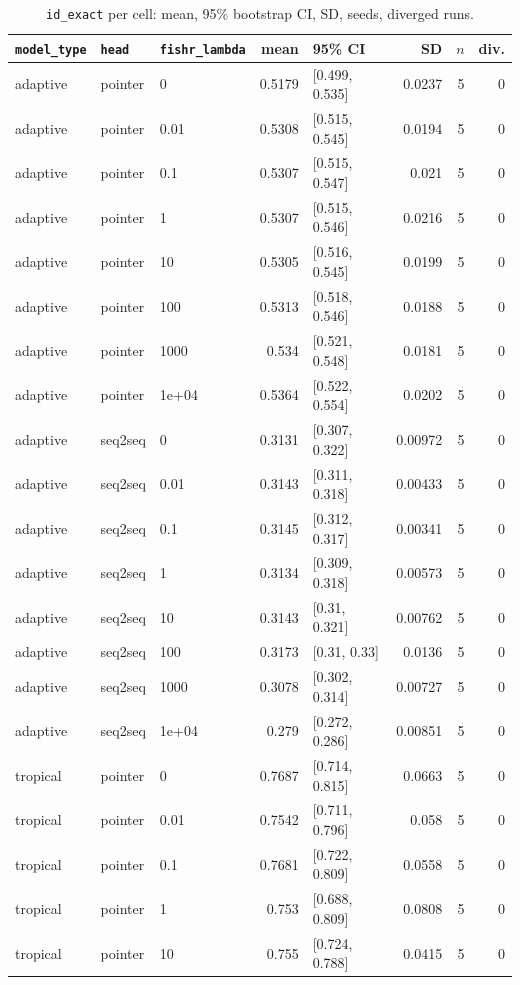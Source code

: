 \documentclass[10pt]{article}
\begin{document}
{\small
\begin{longtable}{lllrlrrr}
\caption{\texttt{id\_exact} per cell: mean, 95\% bootstrap CI, SD, seeds, diverged runs.}\label{tab:summary-id_exact}\\
\toprule
\texttt{model\_type} & \texttt{head} & \texttt{fishr\_lambda} & mean & 95\% CI & SD & $n$ & div.\\
\midrule
\endhead
adaptive & pointer & 0 & 0.5179 & [0.499, 0.535] & 0.0237 & 5 & 0\\
adaptive & pointer & 0.01 & 0.5308 & [0.515, 0.545] & 0.0194 & 5 & 0\\
adaptive & pointer & 0.1 & 0.5307 & [0.515, 0.547] & 0.021 & 5 & 0\\
adaptive & pointer & 1 & 0.5307 & [0.515, 0.546] & 0.0216 & 5 & 0\\
adaptive & pointer & 10 & 0.5305 & [0.516, 0.545] & 0.0199 & 5 & 0\\
adaptive & pointer & 100 & 0.5313 & [0.518, 0.546] & 0.0188 & 5 & 0\\
adaptive & pointer & 1000 & 0.534 & [0.521, 0.548] & 0.0181 & 5 & 0\\
adaptive & pointer & 1e+04 & 0.5364 & [0.522, 0.554] & 0.0202 & 5 & 0\\
adaptive & seq2seq & 0 & 0.3131 & [0.307, 0.322] & 0.00972 & 5 & 0\\
adaptive & seq2seq & 0.01 & 0.3143 & [0.311, 0.318] & 0.00433 & 5 & 0\\
adaptive & seq2seq & 0.1 & 0.3145 & [0.312, 0.317] & 0.00341 & 5 & 0\\
adaptive & seq2seq & 1 & 0.3134 & [0.309, 0.318] & 0.00573 & 5 & 0\\
adaptive & seq2seq & 10 & 0.3143 & [0.31, 0.321] & 0.00762 & 5 & 0\\
adaptive & seq2seq & 100 & 0.3173 & [0.31, 0.33] & 0.0136 & 5 & 0\\
adaptive & seq2seq & 1000 & 0.3078 & [0.302, 0.314] & 0.00727 & 5 & 0\\
adaptive & seq2seq & 1e+04 & 0.279 & [0.272, 0.286] & 0.00851 & 5 & 0\\
tropical & pointer & 0 & 0.7687 & [0.714, 0.815] & 0.0663 & 5 & 0\\
tropical & pointer & 0.01 & 0.7542 & [0.711, 0.796] & 0.058 & 5 & 0\\
tropical & pointer & 0.1 & 0.7681 & [0.722, 0.809] & 0.0558 & 5 & 0\\
tropical & pointer & 1 & 0.753 & [0.688, 0.809] & 0.0808 & 5 & 0\\
tropical & pointer & 10 & 0.755 & [0.724, 0.788] & 0.0415 & 5 & 0\\

\end{longtable}}
\end{document}
